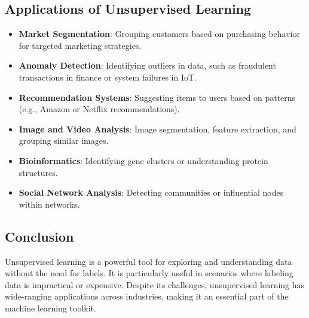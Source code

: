 \subsection*{Applications of Unsupervised Learning}

\begin{itemize}
    \item \textbf{Market Segmentation}: Grouping customers based on purchasing behavior for targeted marketing strategies.
    \item \textbf{Anomaly Detection}: Identifying outliers in data, such as fraudulent transactions in finance or system failures in IoT.
    \item \textbf{Recommendation Systems}: Suggesting items to users based on patterns (e.g., Amazon or Netflix recommendations).
    \item \textbf{Image and Video Analysis}: Image segmentation, feature extraction, and grouping similar images.
    \item \textbf{Bioinformatics}: Identifying gene clusters or understanding protein structures.
    \item \textbf{Social Network Analysis}: Detecting communities or influential nodes within networks.
\end{itemize}

\subsection*{Conclusion}

Unsupervised learning is a powerful tool for exploring and understanding data without the need for labels. It is particularly useful in scenarios where labeling data is impractical or expensive. Despite its challenges, unsupervised learning has wide-ranging applications across industries, making it an essential part of the machine learning toolkit.
